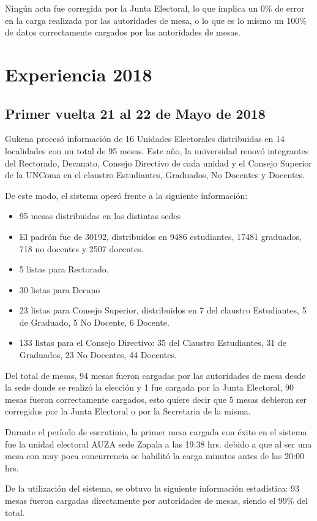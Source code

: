 Ningún acta fue corregida por la Junta Electoral, lo que implica un 0\% de error en la carga realizada por las autoridades de mesa, o lo que es lo mismo un 100\% de datos correctamente cargados por las autoridades de mesas.

\section{Experiencia 2018}
\subsection{Primer vuelta 21 al 22 de Mayo de 2018}
Gukena procesó información de 16 Unidades Electorales distribuidas en 14 localidades con un total de 95 mesas. Este año, la universidad renovó integrantes del Rectorado, Decanato, Consejo Directivo de cada unidad y el Consejo Superior de la UNComa en el claustro Estudiantes, Graduados, No Docentes y Docentes.

De este modo, el sistema operó frente a la siguiente información:
\begin{itemize}
    \item 95 mesas distribuidas en las distintas sedes 
     \item El padrón fue de  30192, distribuidos en 9486 estudiantes, 17481 graduados, 718 no docentes y 2507 docentes.
     \item 5 listas para Rectorado.
     \item 30 listas para Decano
    \item 23 listas para Consejo Superior, distribuidos en 7 del claustro Estudiantes, 5 de Graduado, 5 No Docente, 6 Docente.
    \item 133 listas para el Consejo Directivo: 35 del Claustro Estudiantes, 31 de Graduados, 23 No Docentes, 44 Docentes.
\end{itemize}
Del total de mesas, 94 mesas fueron cargadas por las autoridades de mesa desde la sede donde se realizó la elección y 1 fue cargada por la Junta Electoral, 90 mesas fueron correctamente cargados, esto quiere decir que 5 mesas debieron ser corregidos por la Junta Electoral o por la Secretaria de la misma.

Durante el período de escrutinio, la primer mesa cargada con éxito en el sistema fue la unidad electoral AUZA sede Zapala a las 19:38 hrs. debido a que al ser una mesa con muy poca concurrencia se habilitó la carga minutos antes de las 20:00 hrs.

De la utilización del sistema, se obtuvo la siguiente información estadística:
93 mesas fueron cargadas directamente por autoridades de mesas, siendo el 99\% del total.

